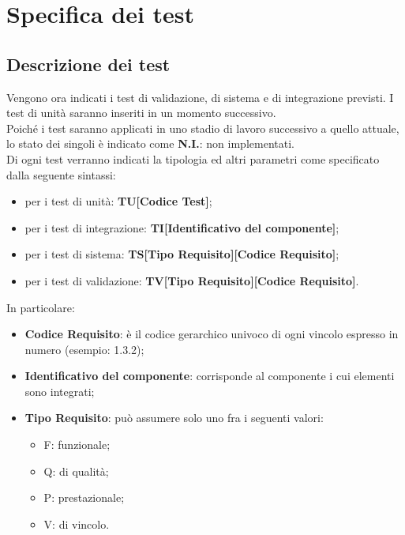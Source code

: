 \section{Specifica dei test}
\label{specificaDeiTest}
	\subsection{Descrizione dei test}
	\label{descrizioneDeiTest}
		Vengono ora indicati i test di validazione, di sistema e di integrazione previsti. I test di unità saranno inseriti in un momento successivo. \\
		Poiché i test saranno applicati in uno stadio di lavoro successivo a quello attuale, lo stato dei singoli è indicato come \textbf{N.I.}: non implementati. \\
		Di ogni test verranno indicati la tipologia ed altri parametri come specificato dalla seguente sintassi:
		\begin{itemize}
					\item per i test di unità: \textbf{TU[Codice Test]};
					\item per i test di integrazione: \textbf{TI[Identificativo del componente]};
					\item per i test di sistema: \textbf{TS[Tipo Requisito][Codice Requisito]};
					\item per i test di validazione: \textbf{TV[Tipo Requisito][Codice Requisito]}.
		\end{itemize}
		In particolare:
		\begin{itemize}
			\item \textbf{Codice Requisito}: è il codice gerarchico univoco di ogni vincolo espresso in numero (esempio: 1.3.2);
			\item \textbf{Identificativo del componente}: corrisponde al componente i cui elementi sono integrati;
			\item \textbf{Tipo Requisito}: può assumere solo uno fra i seguenti valori:
			\begin{itemize}
				\item F: funzionale;
				\item Q: di qualità;
				\item P: prestazionale;
				\item V: di vincolo.
			\end{itemize}
		\end{itemize}
